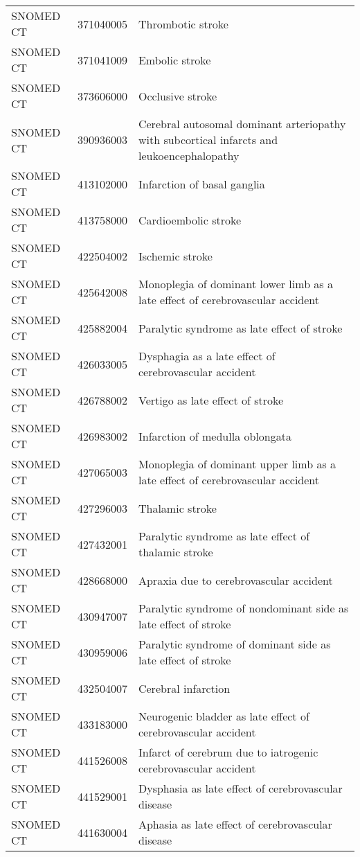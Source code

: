 \begin{longtable}{p{}p{}p{}}
  SNOMED CT & 371040005 & Thrombotic stroke \\ 
  SNOMED CT & 371041009 & Embolic stroke \\ 
  SNOMED CT & 373606000 & Occlusive stroke \\ 
  SNOMED CT & 390936003 & Cerebral autosomal dominant arteriopathy with subcortical infarcts and leukoencephalopathy \\ 
  SNOMED CT & 413102000 & Infarction of basal ganglia \\ 
  SNOMED CT & 413758000 & Cardioembolic stroke \\ 
  SNOMED CT & 422504002 & Ischemic stroke \\ 
  SNOMED CT & 425642008 & Monoplegia of dominant lower limb as a late effect of cerebrovascular accident \\ 
  SNOMED CT & 425882004 & Paralytic syndrome as late effect of stroke \\ 
  SNOMED CT & 426033005 & Dysphagia as a late effect of cerebrovascular accident \\ 
  SNOMED CT & 426788002 & Vertigo as late effect of stroke \\ 
  SNOMED CT & 426983002 & Infarction of medulla oblongata \\ 
  SNOMED CT & 427065003 & Monoplegia of dominant upper limb as a late effect of cerebrovascular accident \\ 
  SNOMED CT & 427296003 & Thalamic stroke \\ 
  SNOMED CT & 427432001 & Paralytic syndrome as late effect of thalamic stroke \\ 
  SNOMED CT & 428668000 & Apraxia due to cerebrovascular accident \\ 
  SNOMED CT & 430947007 & Paralytic syndrome of nondominant side as late effect of stroke \\ 
  SNOMED CT & 430959006 & Paralytic syndrome of dominant side as late effect of stroke \\ 
  SNOMED CT & 432504007 & Cerebral infarction \\ 
  SNOMED CT & 433183000 & Neurogenic bladder as late effect of cerebrovascular accident \\ 
  SNOMED CT & 441526008 & Infarct of cerebrum due to iatrogenic cerebrovascular accident \\ 
  SNOMED CT & 441529001 & Dysphasia as late effect of cerebrovascular disease \\ 
  SNOMED CT & 441630004 & Aphasia as late effect of cerebrovascular disease \\ 

\end{longtable}
